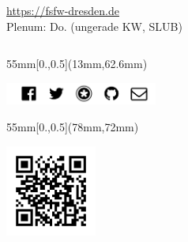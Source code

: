 \documentclass{beamer}
\begin{document}
\begin{frame}[label=ct5]{\color{fg}{}}
 \vspace{-10mm}


\begin{columns}

\begin{flushright}
\huge
\url{https://fsfw-dresden.de}\\
{\tiny Plenum: Do. (ungerade KW, SLUB)}\\[3mm]
\end{flushright}
~
\end{columns}


  \begin{textblock*}{55mm}[0.,0.5](13mm,62.6mm)

 \includegraphics[width=50mm]{img-src/fsfw-netzwerke}

 \end{textblock*}


   \begin{textblock*}{55mm}[0.,0.5](78mm,72mm)

 \includegraphics[width=30mm]{img-src/mitmachen-qr}

 \end{textblock*}


\end{frame}
\end{document}
